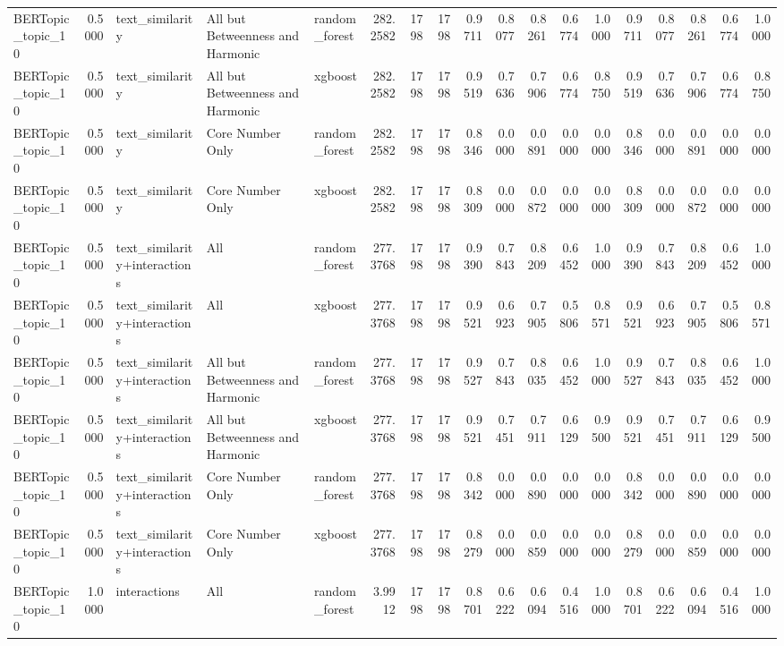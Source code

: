 \begin{tabular}{lrlllrrrrrrrrrrrrr}
BERTopic_topic_10 & 0.5000 & text_similarity & All but Betweenness and Harmonic & random_forest & 282.2582 & 1798 & 1798 & 0.9711 & 0.8077 & 0.8261 & 0.6774 & 1.0000 & 0.9711 & 0.8077 & 0.8261 & 0.6774 & 1.0000 \\
BERTopic_topic_10 & 0.5000 & text_similarity & All but Betweenness and Harmonic & xgboost & 282.2582 & 1798 & 1798 & 0.9519 & 0.7636 & 0.7906 & 0.6774 & 0.8750 & 0.9519 & 0.7636 & 0.7906 & 0.6774 & 0.8750 \\
BERTopic_topic_10 & 0.5000 & text_similarity & Core Number Only & random_forest & 282.2582 & 1798 & 1798 & 0.8346 & 0.0000 & 0.0891 & 0.0000 & 0.0000 & 0.8346 & 0.0000 & 0.0891 & 0.0000 & 0.0000 \\
BERTopic_topic_10 & 0.5000 & text_similarity & Core Number Only & xgboost & 282.2582 & 1798 & 1798 & 0.8309 & 0.0000 & 0.0872 & 0.0000 & 0.0000 & 0.8309 & 0.0000 & 0.0872 & 0.0000 & 0.0000 \\
BERTopic_topic_10 & 0.5000 & text_similarity+interactions & All & random_forest & 277.3768 & 1798 & 1798 & 0.9390 & 0.7843 & 0.8209 & 0.6452 & 1.0000 & 0.9390 & 0.7843 & 0.8209 & 0.6452 & 1.0000 \\
BERTopic_topic_10 & 0.5000 & text_similarity+interactions & All & xgboost & 277.3768 & 1798 & 1798 & 0.9521 & 0.6923 & 0.7905 & 0.5806 & 0.8571 & 0.9521 & 0.6923 & 0.7905 & 0.5806 & 0.8571 \\
BERTopic_topic_10 & 0.5000 & text_similarity+interactions & All but Betweenness and Harmonic & random_forest & 277.3768 & 1798 & 1798 & 0.9527 & 0.7843 & 0.8035 & 0.6452 & 1.0000 & 0.9527 & 0.7843 & 0.8035 & 0.6452 & 1.0000 \\
BERTopic_topic_10 & 0.5000 & text_similarity+interactions & All but Betweenness and Harmonic & xgboost & 277.3768 & 1798 & 1798 & 0.9521 & 0.7451 & 0.7911 & 0.6129 & 0.9500 & 0.9521 & 0.7451 & 0.7911 & 0.6129 & 0.9500 \\
BERTopic_topic_10 & 0.5000 & text_similarity+interactions & Core Number Only & random_forest & 277.3768 & 1798 & 1798 & 0.8342 & 0.0000 & 0.0890 & 0.0000 & 0.0000 & 0.8342 & 0.0000 & 0.0890 & 0.0000 & 0.0000 \\
BERTopic_topic_10 & 0.5000 & text_similarity+interactions & Core Number Only & xgboost & 277.3768 & 1798 & 1798 & 0.8279 & 0.0000 & 0.0859 & 0.0000 & 0.0000 & 0.8279 & 0.0000 & 0.0859 & 0.0000 & 0.0000 \\
BERTopic_topic_10 & 1.0000 & interactions & All & random_forest & 3.9912 & 1798 & 1798 & 0.8701 & 0.6222 & 0.6094 & 0.4516 & 1.0000 & 0.8701 & 0.6222 & 0.6094 & 0.4516 & 1.0000 \\

\end{tabular}
